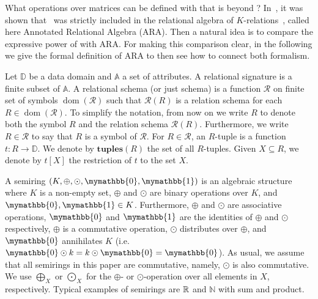 What operations over matrices can be defined with \langsum that is beyond \lang? In~\cite{brijder2019matrices}, it was shown that \lang\ was strictly included in the relational algebra of $K$-relations~\cite{GreenKT07}, called here Annotated Relational Algebra (ARA).
Then a natural idea is to compare the expressive power of \langsum with ARA. For making this comparison clear, in the following we give the formal definition of ARA to then see how to connect both formalism.

\newcommand{\ddom}{\mathbb{D}}
\newcommand{\fdom}{\operatorname{dom}}
\newcommand{\att}{\mathbb{A}}
\newcommand{\tuples}{\mathbf{tuples}}
\newcommand{\supp}{\operatorname{supp}}
\newcommand{\cJ}{\mathcal{J}}
\newcommand{\cR}{\mathcal{R}}
\newcommand{\adom}{\mathbf{adom}}

\newcommand{\ksum}{\oplus}
\newcommand{\kprod}{\odot}
\newcommand{\bigksum}{\bigoplus}
\newcommand{\bigkprod}{\bigodot}
\newcommand{\kzero}{\mymathbb{0}}
\newcommand{\kone}{\mymathbb{1}}

\newcommand{\row}{\mathsf{row}}
\newcommand{\rows}{\mathsf{rows}}
\newcommand{\col}{\mathsf{col}}
\newcommand{\cols}{\mathsf{cols}}


Let $\ddom$ be a data domain and $\att$ a set of attributes. A relational signature is a finite subset of $\att$. A relational schema (or just schema) is a function $\cR$ on finite set of symbols $\fdom(\cR)$ such that $\cR(R)$ is a relation schema for each $R \in \fdom(\cR)$. To simplify the notation, from now on we write $R$ to denote both the symbol $R$ and the relation schema $\cR(R)$.
Furthermore, we write $R \in \cR$ to say that $R$ is a symbol of $\cR$. 
For $R \in \cR$, an $R$-tuple is a function $t: R \rightarrow \ddom$. We denote by $\tuples(R)$ the set of all $R$-tuples. Given $X \subseteq R$, we denote by $t[X]$ the restriction of $t$ to the set $X$.

A semiring $(K, \ksum, \kprod, \kzero, \kone)$ is an algebraic structure where $K$ is a non-empty set, $\ksum$ and $\kprod$ are binary operations over $K$, and $\kzero, \kone \in K$. Furthermore,  $\ksum$ and $\kprod$ are associative operations, $\kzero$ and $\kone$ are the identities of $\ksum$ and $\kprod$ respectively, $\ksum$ is a commutative operation, $\kprod$ distributes over $\ksum$, and $\kzero$ annihilates $K$ (i.e. $\kzero \kprod k = k \kprod \kzero = \kzero$). As usual, we assume that all semirings in this paper are commutative, namely, $\kprod$ is also commutative. We use $\bigksum_X$ or $\bigkprod_X$ for the $\ksum$- or $\kprod$-operation over all elements in $X$, respectively. Typical examples of semirings are $\mathbb{R}$ and $\mathbb{N}$ with sum and product. 


